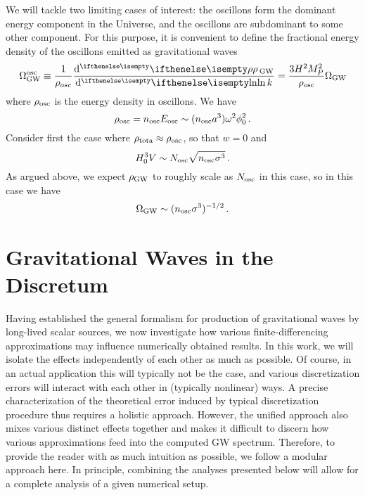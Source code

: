 \documentclass{revtex4}
\begin{document}
We will tackle two limiting cases of interest: the oscillons form the dominant energy component in the Universe, and the oscillons are subdominant to some other component.
For this purpose, it is convenient to define the fractional energy density of the oscillons emitted as gravitational waves
\begin{equation}
  \Omega_{\rm GW}^{\rm osc} \equiv \frac{1}{\rho_{osc}}\frac{\ud\rho_{\rm GW}}{\ud\ln k} = \frac{3H^2M_P^2}{\rho_{\rm osc}}\Omega_{\rm GW}
\end{equation}
where $\rho_{\rm osc}$ is the energy density in oscillons.
We have
\begin{equation}
  \rho_{\rm osc} = n_{\rm osc}E_{\rm osc} \sim (n_{\rm osc}a^3)\omega^2\phi_0^2 \, .
\end{equation}
Consider first the case where $\rho_{\rm tota} \approx \rho_{\rm osc}$, so that $w=0$ and
\begin{equation}
  H_0^3V \sim N_{\rm osc}\sqrt{n_{\rm osc}\sigma^3} \, .
\end{equation}
As argued above, we expect $\rho_{\rm GW}$ to roughly scale as $N_{\rm osc}$ in this case, so in this case we have
\begin{equation}
  \Omega_{\rm GW} \sim (n_{\rm osc}\sigma^3)^{-1/2} \, .
\end{equation}




\section{Gravitational Waves in the Discretum}
Having established the general formalism for production of gravitational waves by long-lived scalar sources, we now investigate how various finite-differencing approximations may influence numerically obtained results.
In this work, we will isolate the effects independently of each other as much as possible.
Of course, in an actual application this will typically not be the case, and various discretization errors will interact with each other in (typically nonlinear) ways.
A precise characterization of the theoretical error induced by typical discretization procedure thus requires a holistic approach.
However, the unified approach also mixes various distinct effects together and makes it difficult to discern how various approximations feed into the computed GW spectrum.
Therefore, to provide the reader with as much intuition as possible, we follow a modular approach here.
In principle, combining the analyses presented below will allow for a complete analysis of a given numerical setup.
\end{document}
